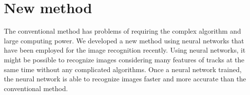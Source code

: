\documentclass{jps-cp}
\begin{document}
\section{New method}
The conventional method has problems of requiring the complex algorithm and large computing power.
We developed a new method using neural networks that have been employed for the image recognition recently.
Using neural networks, it might be possible to recognize images
considering many features of tracks at the same time without any complicated algorithms.
Once a neural network trained, the neural network is able to recognize images faster and more accurate than the conventional method.

\end{document}
